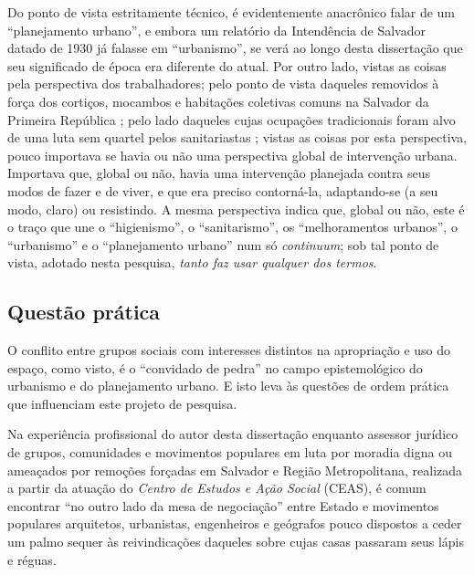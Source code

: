 Do ponto de vista estritamente técnico, é evidentemente anacrônico falar de um ``planejamento urbano'', e embora um relatório da Intendência de Salvador datado de 1930 já falasse em ``urbanismo'', se verá ao longo desta dissertação que seu significado de época era diferente do atual. Por outro lado, vistas as coisas pela perspectiva dos trabalhadores; pelo ponto de vista daqueles removidos à força dos cortiços, mocambos e habitações coletivas comuns na Salvador da Primeira República \cite{cardoso1990proleta}; pelo lado daqueles cujas ocupações tradicionais foram alvo de uma luta sem quartel pelos sanitariastas \cite{barbosa2009}; vistas as coisas por esta perspectiva, pouco importava se havia ou não uma perspectiva global de intervenção urbana. Importava que, global ou não, havia uma intervenção planejada contra seus modos de fazer e de viver, e que era preciso contorná-la, adaptando-se (a seu modo, claro) ou resistindo. A mesma perspectiva indica que, global ou não, este é o traço que une o ``higienismo'', o ``sanitarismo'', os ``melhoramentos urbanos'', o ``urbanismo'' e o ``planejamento urbano'' num só \textit{continuum}; sob tal ponto de vista, adotado nesta pesquisa, \textit{tanto faz usar qualquer dos termos}. 

\subsection{Questão prática}
\label{subsec:questprat}

O conflito entre grupos sociais com interesses distintos na apropriação e uso do espaço, como visto, é o ``convidado de pedra'' no campo epistemológico do urbanismo e do planejamento urbano. E isto leva às questões de ordem prática que influenciam este projeto de pesquisa.

Na experiência profissional do autor desta dissertação enquanto assessor jurídico de grupos, comunidades e movimentos populares em luta por moradia digna ou ameaçados por remoções forçadas em Salvador e Região Metropolitana, realizada a partir da atuação do \textit{Centro de Estudos e Ação Social} (CEAS), é comum encontrar ``no outro lado da mesa de negociação'' entre Estado e movimentos populares arquitetos, urbanistas, engenheiros e geógrafos pouco dispostos a ceder um palmo sequer às reivindicações daqueles sobre cujas casas passaram seus lápis e réguas.

